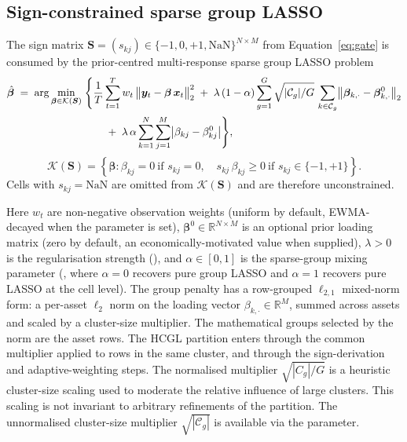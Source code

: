 \documentclass[article]{jss}
\begin{document}
\subsection[Sign-constrained sparse group LASSO]{Sign-constrained sparse group LASSO} \label{sec:sgl-sign}

The sign matrix
$\bm{S} = (s_{kj}) \in \{-1, 0, +1, \mathrm{NaN}\}^{N \times M}$ from
Equation~\ref{eq:gate} is consumed by the prior-centred multi-response
sparse group LASSO problem
%
\begin{align}
	\hat{\bm{\beta}} \;=\; \arg\min_{\bm{\beta} \in \mathcal{K}(\bm{S})} \;&
	\Biggl\{
	\frac{1}{T} \sum_{t = 1}^{T}
	w_{t}\, \bigl\| \bm{y}_{t} - \bm{\beta}\, \bm{x}_{t} \bigr\|_2^2
	\;+\; \lambda\, (1 - \alpha) \sum_{g = 1}^{G} \sqrt{|\mathcal{C}_g| / G}\,
	\sum_{k \in \mathcal{C}_g}
	\bigl\| \bm{\beta}_{k, \cdot} - \bm{\beta}^{0}_{k, \cdot} \bigr\|_2
	\notag \\
	& \qquad +\; \lambda\, \alpha \sum_{k = 1}^{N} \sum_{j = 1}^{M}
	\bigl| \beta_{kj} - \beta^{0}_{kj} \bigr|
	\Biggr\}, \label{eq:sgl-sign}
\end{align}
%
\begin{equation}
	\mathcal{K}(\bm{S}) =
	\left\{
	\bm{\beta} :
	\beta_{kj} = 0 \ \text{if } s_{kj} = 0, \quad
	s_{kj}\, \beta_{kj} \ge 0 \ \text{if } s_{kj} \in \{-1, +1\}
	\right\}.
	\label{eq:sgl-sign-constraint}
\end{equation}
%
Cells with $s_{kj} = \mathrm{NaN}$ are omitted from $\mathcal{K}(\bm{S})$ and are therefore unconstrained.

%
Here $w_t$ are non-negative observation weights (uniform by default,
EWMA-decayed when the  parameter is set),
$\bm{\beta}^{0} \in \mathbb{R}^{N \times M}$ is an optional prior
loading matrix (zero by default, an economically-motivated value when
supplied), $\lambda > 0$ is the regularisation strength
(), and $\alpha \in [0, 1]$ is the sparse-group mixing
parameter (, where $\alpha = 0$ recovers pure group LASSO
and $\alpha = 1$ recovers pure LASSO at the cell level). The group penalty has a row-grouped \(\ell_{2,1}\) mixed-norm form:
a per-asset \(\ell_2\) norm on the loading vector
\(\beta_{k,\cdot}\in\mathbb R^M\), summed across assets and scaled by a
cluster-size multiplier. The mathematical groups selected by the norm are
the asset rows. The HCGL partition enters through the common multiplier
applied to rows in the same cluster, and through the sign-derivation and
adaptive-weighting steps. The normalised multiplier
\(\sqrt{|C_g|/G}\) is a heuristic cluster-size scaling used to moderate
the relative influence of large clusters. This scaling is not invariant to arbitrary
refinements of the partition. The unnormalised cluster-size multiplier $\sqrt{|\mathcal{C}_g|}$
\citep{Yuan+Lin:2006} is available via the 
parameter.
\end{document}
